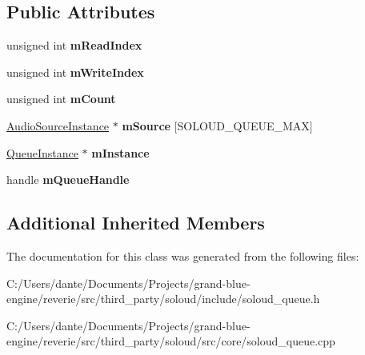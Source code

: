\subsection*{Public Attributes}
\begin{DoxyCompactItemize}
\item 
\mbox{\label{class_so_loud_1_1_queue_a05e07dc982b77550fa654cb8d2f6048e}} 
unsigned int {\bfseries m\+Read\+Index}
\item 
\mbox{\label{class_so_loud_1_1_queue_ab2685b5a0039abfdcd951ccdc24619cd}} 
unsigned int {\bfseries m\+Write\+Index}
\item 
\mbox{\label{class_so_loud_1_1_queue_a2ff4a99a2b9e001cf292d31412e3cbc3}} 
unsigned int {\bfseries m\+Count}
\item 
\mbox{\label{class_so_loud_1_1_queue_a7d9e7f8e4967d78816e0a3a985211f93}} 
\mbox{\hyperlink{class_so_loud_1_1_audio_source_instance}{Audio\+Source\+Instance}} $\ast$ {\bfseries m\+Source} \mbox{[}S\+O\+L\+O\+U\+D\+\_\+\+Q\+U\+E\+U\+E\+\_\+\+M\+AX\mbox{]}
\item 
\mbox{\label{class_so_loud_1_1_queue_a3b08466456f9a1b9d852e16963f21f0f}} 
\mbox{\hyperlink{class_so_loud_1_1_queue_instance}{Queue\+Instance}} $\ast$ {\bfseries m\+Instance}
\item 
\mbox{\label{class_so_loud_1_1_queue_aceec3205e36ca21c0f0e1a51cbb3d800}} 
handle {\bfseries m\+Queue\+Handle}
\end{DoxyCompactItemize}
\subsection*{Additional Inherited Members}


The documentation for this class was generated from the following files\+:\begin{DoxyCompactItemize}
\item 
C\+:/\+Users/dante/\+Documents/\+Projects/grand-\/blue-\/engine/reverie/src/third\+\_\+party/soloud/include/soloud\+\_\+queue.\+h\item 
C\+:/\+Users/dante/\+Documents/\+Projects/grand-\/blue-\/engine/reverie/src/third\+\_\+party/soloud/src/core/soloud\+\_\+queue.\+cpp\end{DoxyCompactItemize}
